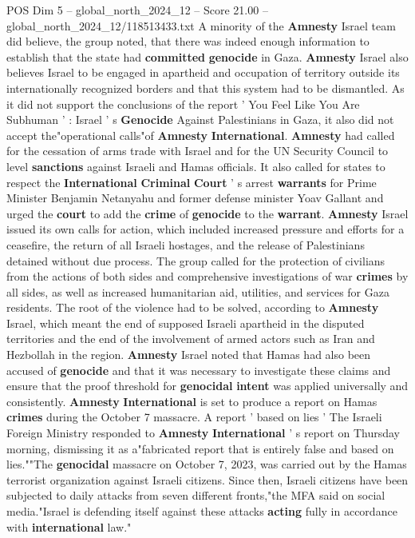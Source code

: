 \begin{textsample}{POS Dim 5 – global\_north\_2024\_12 – Score 21.00 – global\_north\_2024\_12/118513433.txt}
A minority of the \textbf{Amnesty} Israel team did believe, the group noted, that there was indeed enough information to establish that the state had \textbf{committed} \textbf{genocide} in Gaza. \textbf{Amnesty} Israel also believes Israel to be engaged in apartheid and occupation of territory outside its internationally recognized borders and that this system had to be dismantled.
As it did not support the conclusions of the report ' You Feel Like You Are Subhuman ' : Israel ' s \textbf{Genocide} Against Palestinians in Gaza, it also did not accept the"operational calls"of \textbf{Amnesty} \textbf{International}. \textbf{Amnesty} had called for the cessation of arms trade with Israel and for the UN Security Council to level \textbf{sanctions} against Israeli and Hamas officials.
It also called for states to respect the \textbf{International} \textbf{Criminal} \textbf{Court} ' s arrest \textbf{warrants} for Prime Minister Benjamin Netanyahu and former defense minister Yoav Gallant and urged the \textbf{court} to add the \textbf{crime} of \textbf{genocide} to the \textbf{warrant}. \textbf{Amnesty} Israel issued its own calls for action, which included increased pressure and efforts for a ceasefire, the return of all Israeli hostages, and the release of Palestinians detained without due process.
The group called for the protection of civilians from the actions of both sides and comprehensive investigations of war \textbf{crimes} by all sides, as well as increased humanitarian aid, utilities, and services for Gaza residents.
The root of the violence had to be solved, according to \textbf{Amnesty} Israel, which meant the end of supposed Israeli apartheid in the disputed territories and the end of the involvement of armed actors such as Iran and Hezbollah in the region. \textbf{Amnesty} Israel noted that Hamas had also been accused of \textbf{genocide} and that it was necessary to investigate these claims and ensure that the proof threshold for \textbf{genocidal} \textbf{intent} was applied universally and consistently. \textbf{Amnesty} \textbf{International} is set to produce a report on Hamas \textbf{crimes} during the October 7 massacre.
A report ' based on lies ' The Israeli Foreign Ministry responded to \textbf{Amnesty} \textbf{International} ' s report on Thursday morning, dismissing it as a"fabricated report that is entirely false and based on lies.""The \textbf{genocidal} massacre on October 7, 2023, was carried out by the Hamas terrorist organization against Israeli citizens.
Since then, Israeli citizens have been subjected to daily attacks from seven different fronts,"the MFA said on social media."Israel is defending itself against these attacks \textbf{acting} fully in accordance with \textbf{international} law."

\end{textsample}

